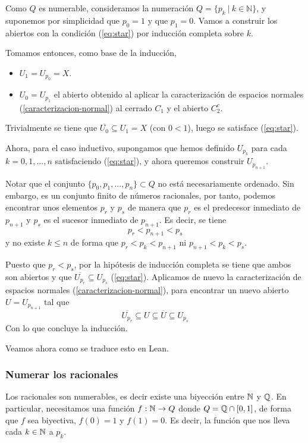 Como $Q$ es numerable, consideramos la numeración $Q = \{p_k ~|~ k \in \mathbb{N}\}$, y suponemos por simplicidad que $p_0 = 1$ y que $p_1 = 0$. Vamos a construir los abiertos con la condición (\ref{eq:star}) por inducción completa sobre $k$.

Tomamos entonces, como base de la inducción,

\begin{itemize}
  \item $U_1 = U_{p_0} = X$.
  \item $U_0 = U_{p_1}$ el abierto obtenido al aplicar la caracterización de espacios normales (\ref{caracterizacion-normal}) al cerrado $C_1$ y el abierto $C_2^c$.
\end{itemize}

Trivialmente se tiene que $\overline{U_0} \subseteq U_1 = X$ (con $0<1$), luego se satisface (\ref{eq:star}).

Ahora, para el caso inductivo, supongamos que hemos definido $U_{p_k}$ para cada $k = 0, 1, ..., n$ satisfaciendo (\ref{eq:star}), y ahora queremos construir $U_{p_{n+1}}$.

Notar que el conjunto $\{p_0, p_1, ..., p_n\} \subset Q$ no está necesariamente ordenado. Sin embargo, es un conjunto finito de números racionales, por tanto, podemos encontrar unos elementos $p_r$ y $p_s$ de manera que $p_r$ es el predecesor inmediato de $p_{n+1}$ y $p_s$ es el sucesor inmediato de $p_{n+1}$. Es decir, se tiene
$$
p_r < p_{n+1} < p_s
$$
y no existe $k\leq n$ de forma que $p_r < p_k < p_{n+1}$ ni $p_{n+1} < p_k < p_s$.

Puesto que $p_r < p_s$, por la hipótesis de inducción completa se tiene que ambos son abiertos y que $\overline{U_{p_r}} \subseteq U_{p_s}$ (\ref{eq:star}). Aplicamos de nuevo la caracterización de espacios normales (\ref{caracterizacion-normal}), para encontrar un nuevo abierto $U = U_{p_{n+1}}$ tal que
$$
\overline{U_{p_r}} \subseteq U \subseteq \overline{U} \subseteq U_{p_s}
$$
Con lo que concluye la inducción.

Veamos ahora como se traduce esto en Lean.

\subsubsection{Numerar los racionales}

Los racionales son numerables, es decir existe una biyección entre $\mathbb{N}$ y $\mathbb{Q}$. En particular, necesitamos una función $f : \mathbb{N} \to Q$ donde $Q = \mathbb{Q} \cap [0, 1]$, de forma que $f$ sea biyectiva, $f(0) = 1$ y $f(1) = 0$. Es decir, la función que nos lleva cada $k \in \mathbb{N}$ a $p_k$.

